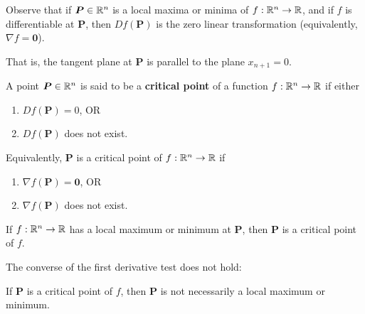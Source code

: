 \begin{remark}
        Observe that if $\bm{P} \in \mathbb{R}^n$ is a local maxima or minima of $f: \mathbb{R}^n \to \mathbb{R}$, and if $f$ is differentiable at $\bm{P}$, then $Df(\bm{P})$ is the zero linear transformation (equivalently, $\nabla f = \bm{0}$).

        That is, the tangent plane at $\bm{P}$ is parallel to the plane $x_{n+1} = 0$.
    \end{remark}

\begin{definition}
        A point $\bm{P} \in \mathbb{R}^n$ is said to be a \textbf{critical point} of a function $f: \mathbb{R}^n \to \mathbb{R}$ if either

        \begin{enumerate}
            \item $Df(\bm{P}) = 0$, OR
            \item $Df(\bm{P})$ does not exist.
        \end{enumerate}
      
    \end{definition}

\begin{proposition}
     Equivalently, $\bm{P}$ is a critical point of $f: \mathbb{R}^n \to \mathbb{R}$ if
    \begin{enumerate}
            \item $\nabla f(\bm{P}) = \bm{0}$, OR
            \item $\nabla f(\bm{P})$ does not exist.
        \end{enumerate}
\end{proposition}


\begin{theorem}
        If $f: \mathbb{R}^n \to \mathbb{R}$ has a local maximum or minimum at $\bm{P}$, then $\bm{P}$ is a critical point of $f$.
    \end{theorem}


    \begin{remark}
        The converse of the first derivative test does not hold:
        
        If $\bm{P}$ is a critical point of $f$, then $\bm{P}$ is not necessarily a local maximum or minimum.
    \end{remark}

